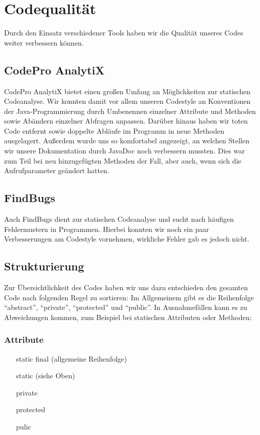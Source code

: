 \documentclass[parskip=full]{scrreprt}
\begin{document}
\chapter{Codequalität}

Durch den Einsatz verschiedener Tools haben wir die Qualität unseres Codes weiter verbessern können.

\section{CodePro AnalytiX}

CodePro AnalytiX bietet einen großen Umfang an Möglichkeiten zur statischen Codeanalyse. Wir konnten damit vor allem unseren Codestyle an Konventionen der Java-Programmierung durch Umbenennen einzelner Attribute und Methoden sowie Abändern einzelner Abfragen anpassen. Darüber hinaus haben wir toten Code entfernt sowie doppelte Abläufe im Programm in neue Methoden ausgelagert.
Außerdem wurde uns so komfortabel angezeigt, an welchen Stellen wir unsere Dokumentation durch JavaDoc noch verbessern mussten. Dies war zum Teil bei neu hinzugefügten Methoden der Fall, aber auch, wenn sich die Aufrufparameter geändert hatten.

\section{FindBugs}

Auch FindBugs dient zur statischen Codeanalyse und sucht nach häufigen Fehlermustern in Programmen. Hierbei konnten wir noch ein paar Verbesserungen am Codestyle vornehmen, wirkliche Fehler gab es jedoch nicht. 

\section{Strukturierung}
Zur Übersichtlichkeit des Codes haben wir uns dazu entschieden den gesamten Code nach folgenden Regel zu sortieren: \newline
Im Allgemeinem gibt es die Reihenfolge "`abstract"', "`private"', "`protected"' und "`public"'. In Ausnahmefällen kann es zu Abweichungen kommen, zum Beispiel bei statischen Attributen oder Methoden:
\subsection{Attribute}
\begin{enumerate}
	\item[static final] (allgemeine Reihenfolge) 
	\item[static] (siehe Oben)
	\item[private]
	\item[protected]
	\item[pulic]
\end{enumerate}
\end{document}
